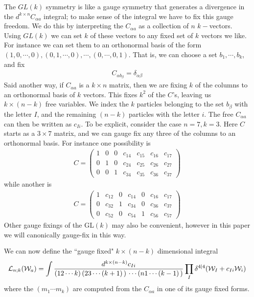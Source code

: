 \documentclass[12pt]{article}
\newcommand{\be}{\begin{eqnarray}}
\newcommand{\ee}{\end{eqnarray}}
\begin{document}
The $GL(k)$ symmetry is like a gauge symmetry that generates a divergence in the $d^{k\times n}C_{\alpha a}$ integral; to make sense of the integral we have to fix this gauge freedom. We do this by interpreting the $C_{\alpha a}$ as a collection of $n$ $k-$vectors.
Using $GL(k)$ we can set $k$ of these vectors to any fixed set of $k$ vectors we like. For instance we can set them to an orthonormal basis of the form
$(1,0,\cdots,0), (0,1,\cdots,0), \cdots, (0,\cdots,0,1)$. That is, we can choose a set $b_1,\cdots,b_k$, and fix
\be
C_{\alpha b_\beta } = \delta_{\alpha \beta }
\ee
Said another way, if $C_{\alpha a}$ is a $k \times n$ matrix, then we are fixing $k$ of the columns to an orthonormal basis of $k$ vectors.
This fixes $k^2$ of the $C$'s, leaving us $k \times (n-k)$ free variables. We index the $k$ particles belonging to the set $b_\beta$ with the letter
$I$, and the remaining $(n-k)$ particles with the letter $i$. The free $C_{\alpha a}$ can then be written as $c_{Ii}$.
To be explicit, consider the case $n=7,k=3$. Here $C$ starts as a
$3 \times 7$ matrix, and we can gauge fix any three of the columns to an orthonormal basis. For instance one possibility is
\be
\label{eq:gf1}
C = \left(\begin{array}{ccccccc} 1 & 0 & 0 & c_{14} & c_{15} & c_{16} & c_{17} \\ 0 & 1 & 0 & c_{24} & c_{25} & c_{26} & c_{27} \\ 0 & 0 & 1 & c_{34} & c_{35} & c_{36} & c_{37} \end{array} \right)
\ee
while another is
\be
\label{eq:gf2}
C = \left(\begin{array}{ccccccc} 1 & c_{12} & 0 & c_{14} & 0 & c_{16} & c_{17} \\ 0 & c_{32} & 1 & c_{34} & 0 & c_{36} & c_{37} \\ 0 & c_{52} & 0 & c_{54} &
1 & c_{56} & c_{57} \end{array} \right)
\ee
Other gauge fixings of the GL$(k)$ may also be convenient, however in this paper we will canonically gauge-fix in this way.

We can now define the ``gauge fixed" $k \times (n-k)$ dimensional integral \be
{\cal L}_{n;k}({\cal W}_a) = \int \frac{d^{k \times (n-k)} c_{Ii}} {(12\cdots k) \, (23\cdots (k+1) \,) \, \cdots (n 1 \cdots (k-1) \,)} \prod_I
\delta^{4|4}({\cal W}_I + c_{Ii} {\cal W}_i)
\ee
where the $(m_1 \cdots m_k)$ are computed from the $C_{\alpha a}$ in one of its gauge fixed forms.
\end{document}
